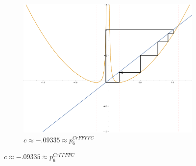 \begin{figure}[ht]
\begin{subfigure}[b]{0.3\textwidth}
				\includegraphics[width=\textwidth]{./img/plot-009335}
				\caption{$c \approx -.09335 \approx p_6^{CrFFFFC}$}
		\end{subfigure}


\end{figure}
